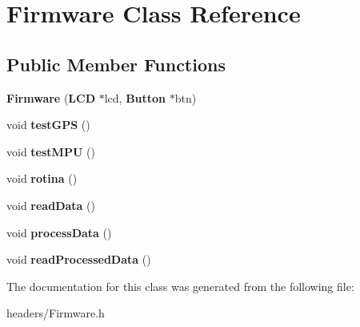 \section{Firmware Class Reference}
\label{class_firmware}
\subsection*{Public Member Functions}
\begin{DoxyCompactItemize}
\item 
{\bfseries Firmware} ({\bf L\+CD} $\ast$lcd, {\bf Button} $\ast$btn)\label{class_firmware_a16ad41892a7c7cde4c53ac080831d97f}

\item 
void {\bfseries test\+G\+PS} ()\label{class_firmware_aaeae6c386c171a16b90dfc793ebd1b75}

\item 
void {\bfseries test\+M\+PU} ()\label{class_firmware_a8912b984eea8a51c7caa25d7c342cd25}

\item 
void {\bfseries rotina} ()\label{class_firmware_a0a9095039770c3a0cea2ed418797f4ec}

\item 
void {\bfseries read\+Data} ()\label{class_firmware_af40ff6a1ceb0cd5f5a3d0614eb5b6a25}

\item 
void {\bfseries process\+Data} ()\label{class_firmware_af92e47175e07b40bcf143b9342688f5a}

\item 
void {\bfseries read\+Processed\+Data} ()\label{class_firmware_ac971e0bf9545fcff8b98bfb1c2b280b4}

\end{DoxyCompactItemize}


The documentation for this class was generated from the following file\+:\begin{DoxyCompactItemize}
\item 
headers/Firmware.\+h\end{DoxyCompactItemize}
